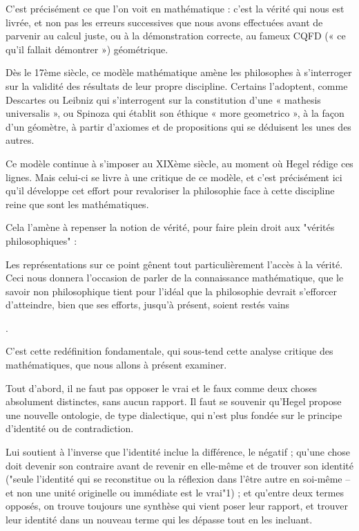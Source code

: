 C’est précisément ce que l’on voit en mathématique : c’est la vérité qui nous est livrée, et non pas les erreurs successives que nous avons effectuées avant de parvenir au calcul juste, ou à la démonstration correcte, au fameux CQFD (« ce qu’il fallait démontrer ») géométrique.

Dès le 17ème siècle, ce modèle mathématique amène les philosophes à s’interroger sur la validité des résultats de leur propre discipline. Certains l’adoptent, comme Descartes ou Leibniz qui s’interrogent sur la constitution d’une « mathesis universalis », ou Spinoza qui établit son éthique « more geometrico », à la façon d’un géomètre, à partir d’axiomes et de propositions qui se déduisent les unes des autres.

Ce modèle continue à s’imposer au XIXème siècle, au moment où Hegel rédige ces lignes. Mais celui-ci se livre à une critique de ce modèle, et c’est précisément ici qu’il développe cet effort pour revaloriser la philosophie face à cette discipline reine que sont les mathématiques.

Cela l’amène à repenser la notion de vérité, pour faire plein droit aux "vérités philosophiques" :

    Les représentations sur ce point gênent tout particulièrement l’accès à la vérité. Ceci nous donnera l’occasion de parler de la connaissance mathématique, que le savoir non philosophique tient pour l’idéal que la philosophie devrait s’efforcer d’atteindre, bien que ses efforts, jusqu’à présent, soient restés vains

.

C’est cette redéfinition fondamentale, qui sous-tend cette analyse critique des mathématiques, que nous allons à présent examiner.

Tout d’abord, il ne faut pas opposer le vrai et le faux comme deux choses absolument distinctes, sans aucun rapport. Il faut se souvenir qu’Hegel propose une nouvelle ontologie, de type dialectique, qui n’est plus fondée sur le principe d’identité ou de contradiction.

Lui soutient à l’inverse que l’identité inclue la différence, le négatif ; qu’une chose doit devenir son contraire avant de revenir en elle-même et de trouver son identité ("seule l’identité qui se reconstitue ou la réflexion dans l’être autre en soi-même – et non une unité originelle ou immédiate est le vrai"1) ; et qu’entre deux termes opposés, on trouve toujours une synthèse qui vient poser leur rapport, et trouver leur identité dans un nouveau terme qui les dépasse tout en les incluant.

